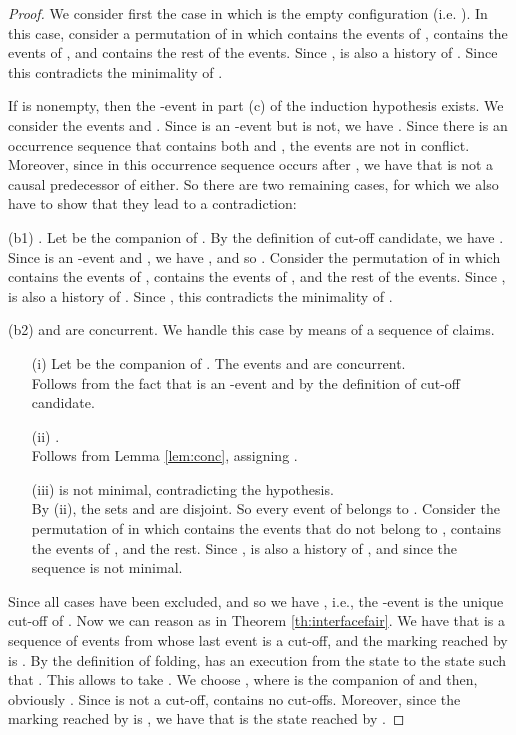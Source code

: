 \documentclass{llncs}
\begin{document}
\begin{proof}
We consider first the case in which  is the empty configuration (i.e. ).
In this case, consider a permutation  of  in which  contains the events of ,  contains the events of , and  contains the rest of the events.
Since ,  is also a history of .
Since  this contradicts the minimality of .

If  is nonempty, then the -event  in part (c) of the induction hypothesis exists.
We consider the events  and . Since  is an -event but  is not,
we have . Since there is an occurrence sequence that contains
both  and , the events are not in conflict. Moreover, since in this occurrence sequence
 occurs after , we have that  is not a causal predecessor of  either.
So there are two remaining cases, for which we also have to show that they lead to a contradiction: 

\vspace{0.1cm}
\noindent (b1) . Let  be the companion of . By the definition of cut-off
candidate, we have . Since  is an -event and , we have 
, and so . Consider the permutation  of
 in which  contains the events of ,
 contains the events of , and  the rest
of the events. Since ,  is also a history of . Since
, this contradicts the minimality of .

\vspace{0.1cm}
\noindent (b2)  and  are concurrent. We handle this case by means 
of a sequence of claims. 
\begin{itemize}
\item[(i)]  Let  be the companion of . The events  and  are concurrent. \\
Follows from the fact that  is an -event
and  by the definition of cut-off candidate.
\item[(ii)] .\\
Follows from Lemma \ref{lem:conc}, assigning .
\item[(iii)]  is not minimal, contradicting the hypothesis.\\
By (ii), the sets  and  are disjoint.
So every event of  belongs to .
Consider the permutation  of
 in which  contains the events that do not belong to ,
 contains the events of , and  the rest. 
Since ,  is also a history of , and since
 the sequence  is not minimal.
\end{itemize}

Since all cases have been excluded, and so we have , i.e., the -event 
 is the unique cut-off of . Now we can reason as in Theorem \ref{th:interfacefair}. We have that
 is a sequence of events from  whose last event is a cut-off, and 
the marking reached by  is .
By the definition of folding,  has an execution  from the state 
 to the state  such that 
. This allows to take . 
We choose , 
where  is the companion of  and then, obviously . 
Since  is not a cut-off,  contains no cut-offs. Moreover, since the marking 
reached by  is , we have that  is the state reached by 
.
\end{proof}
\end{document}
